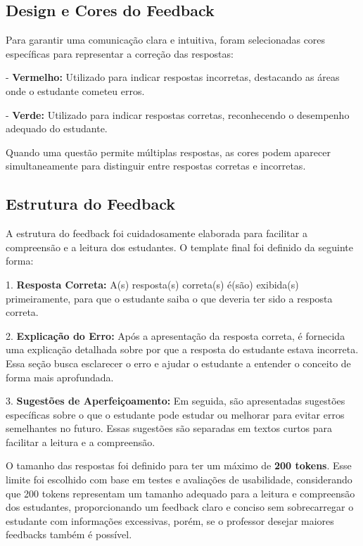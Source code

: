 \subsection{Design e Cores do Feedback}

Para garantir uma comunicação clara e intuitiva, foram selecionadas cores específicas para representar a correção das respostas:

- \textbf{Vermelho:} Utilizado para indicar respostas incorretas, destacando as áreas onde o estudante cometeu erros.

- \textbf{Verde:} Utilizado para indicar respostas corretas, reconhecendo o desempenho adequado do estudante.

Quando uma questão permite múltiplas respostas, as cores podem aparecer simultaneamente para distinguir entre respostas corretas e incorretas.

\subsection{Estrutura do Feedback}

A estrutura do feedback foi cuidadosamente elaborada para facilitar a compreensão e a leitura dos estudantes. O template final foi definido da seguinte forma:

1. \textbf{Resposta Correta:} A(s) resposta(s) correta(s) é(são) exibida(s) primeiramente, para que o estudante saiba o que deveria ter sido a resposta correta.

2. \textbf{Explicação do Erro:} Após a apresentação da resposta correta, é fornecida uma explicação detalhada sobre por que a resposta do estudante estava incorreta. Essa seção busca esclarecer o erro e ajudar o estudante a entender o conceito de forma mais aprofundada.

3. \textbf{Sugestões de Aperfeiçoamento:} Em seguida, são apresentadas sugestões específicas sobre o que o estudante pode estudar ou melhorar para evitar erros semelhantes no futuro. Essas sugestões são separadas em textos curtos para facilitar a leitura e a compreensão.

O tamanho das respostas foi definido para ter um máximo de \textbf{200 tokens}. Esse limite foi escolhido com base em testes e avaliações de usabilidade, considerando que 200 tokens representam um tamanho adequado para a leitura e compreensão dos estudantes, proporcionando um feedback claro e conciso sem sobrecarregar o estudante com informações excessivas, porém, se o professor desejar maiores feedbacks também é possível.

